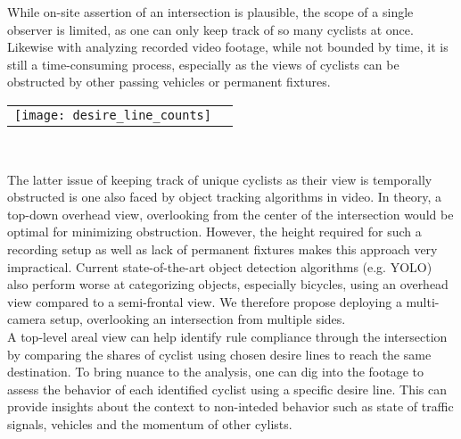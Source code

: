  While on-site assertion of an intersection is plausible, the scope of a single observer is limited, as one can only keep track of 
 so many cyclists at once. Likewise with analyzing recorded video footage, while not bounded by time, it is still a time-consuming process, 
 especially as the views of cyclists can be obstructed by other passing vehicles or permanent fixtures.
\ \\

\raggedbottom
\noindent
\begin{tabular}{@{}cc}
\texttt{[image: desire\_line\_counts]} 
\end{tabular}
\

The latter issue of keeping track of unique cyclists as their view is temporally obstructed is one also faced by 
object tracking algorithms in video. In theory, a top-down overhead view, overlooking from the center of the intersection would be optimal for minimizing obstruction.
However, the height required for such a recording setup as well as lack of permanent fixtures makes this approach very impractical. 
Current state-of-the-art object detection algorithms (e.g. YOLO) also perform worse at categorizing objects, especially bicycles, 
using an overhead view compared to a semi-frontal view. We therefore propose deploying a multi-camera setup, overlooking an intersection from
multiple sides.
\ \\

A top-level areal view can help identify rule compliance through the intersection by comparing
the shares of cyclist using chosen desire lines to reach the same destination. 
To bring nuance to the analysis, one can dig into the footage to assess the behavior of 
each identified cyclist using a specific desire line. 
This can provide insights about the context to non-inteded behavior such as state of traffic signals, 
vehicles and the momentum of other cylists.